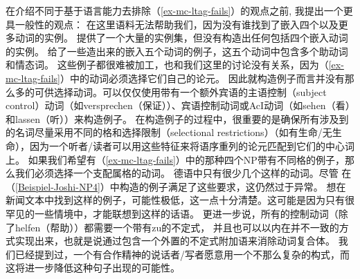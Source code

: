 在介绍不同于基于语言能力去排除（\ref{ex-mc-ltag-fails}）的观点之前, 我提出一个更具一般性的观点：
在这里语料无法帮助我们，因为没有谁找到了嵌入四个以及更多动词的实例。 \citet{Bech55a}提供了一个大量的实例集，但没有构造出任何包括四个嵌入动词的实例。 \citet[--95]{Meurers99c}给了一些造出来的嵌入五个动词的例子，这五个动词中包含多个助动词和情态词。
这些例子都很难被加工，也和我们这里的讨论没有关系，因为（\ref{ex-mc-ltag-fails}）中的动词必须选择它们自己的论元。
因此就构造例子而言并没有那么多的可供选择动词。可以仅仅使用带有一个额外宾语的主语控制（subject control）动词（如versprechen（保证））、宾语控制动词或AcI动词（如sehen（看）和lassen（听））来构造例子。
在构造例子的过程中，很重要的是确保所有涉及到的名词尽量采用不同的格和选择限制（selectional restrictions）（如有生命/无生命），因为一个听者/读者可以用这些特征来将语序重列的论元匹配到它们的中心词上。
如果我们希望有（\ref{ex-mc-ltag-fails}）中的那种四个NP带有不同格的例子，那么我们必须选择一个支配属格的动词。
德语中只有很少几个这样的动词。尽管 \citet{JBR2000a}在（\ref{Beispiel-Joshi-NP4}）中构造的例子满足了这些要求，这仍然过于异常。
想在新闻文本中找到这样的例子，可能性极低，这一点十分清楚。这可能是因为只有很罕见的一些情境中，才能联想到这样的话语。
更进一步说，所有的控制动词（除了helfen（帮助））都需要一个带有zu的不定式，
并且也可以以内在并不一致的方式实现出来，也就是说通过包含一个外置的不定式附加语来消除动词复合体。
我们已经提到过，一个有合作精神的说话者/写者愿意用一个不那么复杂的构式，而这将进一步降低这种句子出现的可能性。

